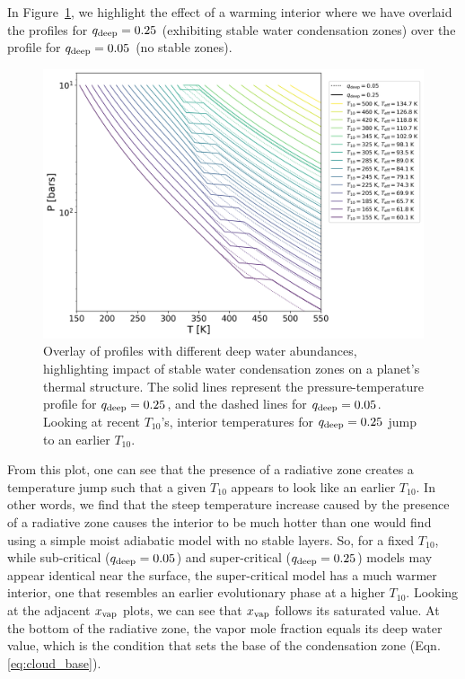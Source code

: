 \documentclass[11pt]{ucscthesisbs}
\begin{document}
In Figure~\ref{fig:overlay}, we highlight the effect of a warming interior where we have overlaid the profiles for $q_{\rm deep} = 0.25$ (exhibiting stable water condensation zones) over the profile for $q_{\rm deep}=0.05$ (no stable zones). 
\begin{figure}[ht]{}
 \centerline{
  \includegraphics[width=\columnwidth]{figures/thesis_static_radiative_layer_plot_diff_qdeep_overlay.png}
 }
\caption[Impact of Radiative Layer on $T_{10}$]
{Overlay of profiles with different deep water abundances, highlighting impact of stable water condensation zones on a planet's thermal structure. The solid lines represent the pressure-temperature profile for $q_{\rm deep} = 0.25$, and the dashed lines for $q_{\rm deep}=0.05$. Looking at recent $T_{10}$'s, interior temperatures for $q_{\rm deep} = 0.25$ jump to an earlier $T_{10}$.}
\label{fig:overlay}
\end{figure}
From this plot, one can see that the presence of a radiative zone creates a temperature jump such that a given $T_{10}$ appears to look like an earlier $T_{10}$. In other words, we find that the steep temperature increase caused by the presence of a radiative zone causes the interior to be much hotter than one would find using a simple moist adiabatic model with no stable layers. So, for a fixed $T_{10}$, while sub-critical ($q_{\rm deep} = 0.05$) and super-critical ($q_{\rm deep} = 0.25$) models may appear identical near the surface, the super-critical model has a much warmer interior, one that resembles an earlier evolutionary phase at a higher $T_{10}$. Looking at the adjacent $x_{\rm vap}$ plots, we can see that $x_{\rm vap}$ follows its saturated value. At the bottom of the radiative zone, the vapor mole fraction equals its deep water value, which is the condition that sets the base of the condensation zone (Eqn. \ref{eq:cloud_base}). 
\end{document}
